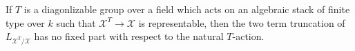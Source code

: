 \begin{lemma}\label{rl-000F}\label{lem:two-term-truncation-of-fixed-locus-cotangent-complex-no-fixed-part}
  If \(T\) is a diagonlizable group over a field which acts on an algebraic stack of finite type over \(k\) such that \(\mathcal X^T\to \mathcal X\) is representable, then the two term truncation of \(L_{\mathcal X^T/\mathcal X}\) has no fixed part with respect to the natural \(T\)-action.
\end{lemma}
